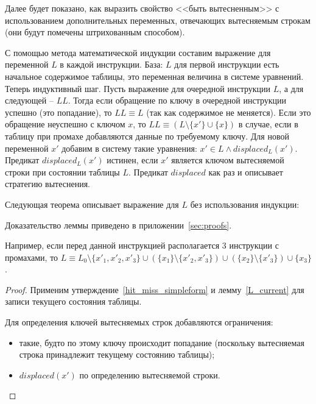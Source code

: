 Далее будет показано, как выразить свойство <<быть вытесненным>> с
использованием дополнительных переменных, отвечающих вытесняемым строкам (они
будут помечены штрихованным способом).

С помощью метода математической индукции составим выражение для переменной $L$ в каждой инструкции. База: $L$ для первой инструкции есть начальное содержимое таблицы, это переменная величина в
системе уравнений. Теперь индуктивный шаг. Пусть выражение для
очередной инструкции $L$, а для следующей -- $LL$. Тогда если
обращение по ключу в очередной инструкции успешно (это попадание), то $LL
\equiv L$ (так как содержимое не меняется). Если это обращение неуспешно с
ключом $x$, то $LL \equiv (L \setminus \{x'\} \cup \{x\})$ в случае, если
в таблицу при промахе добавляются данные по требуемому ключу.
Для новой переменной $x'$ добавим в систему такие уравнения: $x' \in
L \wedge displaced_L(x')$. Предикат $displaced_L(x')$ истинен, если $x'$
является ключом вытесняемой строки при состоянии таблицы $L$. Предикат
$displaced$ как раз и описывает
стратегию вытеснения.

Следующая теорема описывает выражение для $L$ без использования
индукции:
\begin{lemma}\label{L_current} \LcurrentBody
\end{lemma}
Доказательство леммы приведено в приложении~\ref{sec:proofs}.

Например, если перед данной инструкцией располагается 3 инструкции с
промахами, то $L \equiv L_0 \setminus \{x'_1, x'_2, x'_3\} \cup
(\{x_1\} \setminus \{x'_2, x'_3\}) \cup (\{x_2\} \setminus \{x'_3\})
\cup \{x_3\}$.

\begin{theorem}\label{hit_miss_equations} \HitMissEquations
\end{theorem}
\begin{proof}
Применим утверждение~\ref{hit_miss_simpleform} и лемму~\ref{L_current} для
записи текущего
состояния таблицы.

Для определения ключей вытесняемых строк добавляются ограничения:
\begin{itemize}
    \item такие, будто по этому ключу происходит попадание (поскольку
вытесняемая строка
принадлежит текущему состоянию таблицы);
    \item $displaced(x')$ по определению вытесняемой строки.
\end{itemize}
\end{proof}

